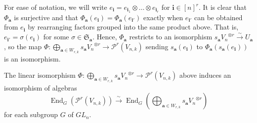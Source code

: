 \documentclass[ALCO,Unicode,published]{cedram}
\newcommand{\PP}{\mathcal{P}}
\newcommand{\SG}{\mathfrak{S}}
\newcommand{\bfa}{{\boldsymbol{a}}}
\newcommand{\bfi}{{\boldsymbol{i}}}
\DeclareMathOperator{\End}{End}
\begin{document}
For ease of notation, we will write $e_\bfi=e_{\bfi_1}\otimes\dots\otimes e_{\bfi_r}$ for $\bfi\in[n]^r$. It is clear that $\Phi_\bfa$ is surjective and that $\Phi_\bfa(e_\bfi)=\Phi_\bfa(e_{\bfi'})$ exactly when $e_{\bfi'}$ can be obtained from $e_\bfi$ by rearranging factors grouped into the same product above. That is, $e_{\bfi'}=\sigma(e_\bfi)$ for some $\sigma\in\SG_\bfa$. Hence, $\Phi_\bfa$ restricts to an isomorphism $s_\bfa{V_n}^{\otimes r}\stackrel{\sim}{\longrightarrow} U_\bfa$, so the map $\Phi:\bigoplus_{\bfa\in W_{r,k}}s_\bfa {V_n}^{\otimes r}\to \PP^r(V_{n,k})$ sending $s_\bfa(e_\bfi)$ to $\Phi_\bfa(s_\bfa(e_\bfi))$ is an isomorphism.

\begin{lemma}\label{lem:induced_isomorphism}
    The linear isomorphism $\Phi: \bigoplus_{\bfa\in W_{r,k}} s_\bfa{V_n}^{\otimes r}\to\PP^r(V_{n,k})$ above induces an isomorphism of algebras \[\End_G(\PP^r(V_{n,k}))\stackrel{\sim}{\longrightarrow}\End_G\left(\bigoplus_{\bfa\in W_{r,k}}s_\bfa{V_n}^{\otimes r}\right)\] for each subgroup $G$ of $GL_n$.
\end{lemma}
\end{document}
